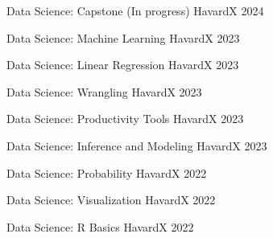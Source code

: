 \begin{cvhonors}

  \cvhonor
    {Data Science: Capstone (In progress)} %
    {HavardX} %
    {} %
    {2024} %

  \cvhonor
    {Data Science: Machine Learning} %
    {HavardX} %
    {} %
    {2023} %

  \cvhonor
    {Data Science: Linear Regression} %
    {HavardX} %
    {} %
    {2023} %

  \cvhonor
    {Data Science: Wrangling} %
    {HavardX} %
    {} %
    {2023} %

  \cvhonor
    {Data Science: Productivity Tools} %
    {HavardX} %
    {} %
    {2023} %

  \cvhonor
    {Data Science: Inference and Modeling} %
    {HavardX} %
    {} %
    {2023} %

  \cvhonor
    {Data Science: Probability} %
    {HavardX} %
    {} %
    {2022} %

  \cvhonor
    {Data Science: Visualization} %
    {HavardX} %
    {} %
    {2022} %

  \cvhonor
    {Data Science: R Basics} %
    {HavardX} %
    {} %
    {2022} %

\end{cvhonors}



